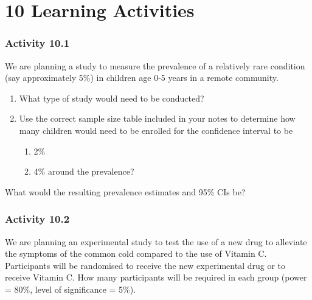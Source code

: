 \documentclass[
]{memoir}
\providecommand{\tightlist}{%
  \setlength{\itemsep}{0pt}\setlength{\parskip}{0pt}}
\begin{document}
\hypertarget{learning-activities-9}{%
\chapter*{\texorpdfstring{\textbf{10} Learning Activities}{10 Learning Activities}}\label{learning-activities-9}}

\hypertarget{activity-10.1}{%
\subsection*{Activity 10.1}\label{activity-10.1}}

We are planning a study to measure the prevalence of a relatively rare condition (say approximately 5\%) in children age 0-5 years in a remote community.

\begin{enumerate}
\def\labelenumi{\alph{enumi})}
\tightlist
\item
  What type of study would need to be conducted?
\item
  Use the correct sample size table included in your notes to determine how many children would need to be enrolled for the confidence interval to be

  \begin{enumerate}
  \def\labelenumii{\roman{enumii}.}
  \tightlist
  \item
    2\%
  \item
    4\% around the prevalence?
  \end{enumerate}
\end{enumerate}

What would the resulting prevalence estimates and 95\% CIs be?

\hypertarget{activity-10.2}{%
\subsection*{Activity 10.2}\label{activity-10.2}}

We are planning an experimental study to test the use of a new drug to alleviate the symptoms of the common cold compared to the use of Vitamin C. Participants will be randomised to receive the new experimental drug or to receive Vitamin C. How many participants will be required in each group (power = 80\%, level of significance = 5\%).
\end{document}
